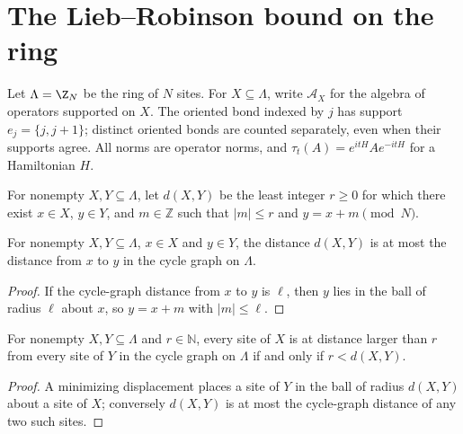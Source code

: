 \section{The Lieb--Robinson bound on the ring}
\label{sec:ring_dynamics_lieb_robinson}

Let $\Lambda=\Z_N$ be the ring of $N$ sites. For $X\subseteq\Lambda$, write
$\mathcal A_X$ for the algebra of operators supported on $X$. The oriented bond
indexed by $j$ has support $e_j=\{j,j+1\}$; distinct oriented bonds are counted
separately, even when their supports agree. All norms are operator norms, and
$\tau_t(A)=e^{itH}Ae^{-itH}$ for a Hamiltonian $H$.

\begin{definition}
    \label{aux:ring-support-distance}
    \leanok
    For nonempty $X,Y\subseteq\Lambda$, let $d(X,Y)$ be the least integer $r\geq0$
    for which there exist $x\in X$, $y\in Y$, and $m\in\mathbb Z$ such that
    $|m|\leq r$ and $y=x+m\pmod N$.
\end{definition}

\begin{lemma}
    \label{aux:ring-support-distance-cycle}
    \leanok
    For nonempty $X,Y\subseteq\Lambda$, $x\in X$ and $y\in Y$, the distance $d(X,Y)$ is at
    most the distance from $x$ to $y$ in the cycle graph on $\Lambda$.
\end{lemma}
\begin{proof}\leanok
    If the cycle-graph distance from $x$ to $y$ is $\ell$, then $y$ lies in the ball of
    radius $\ell$ about $x$, so $y=x+m$ with $|m|\le\ell$.
\end{proof}

\begin{lemma}
    \label{aux:ring-support-distance-separation}
    \leanok
    For nonempty $X,Y\subseteq\Lambda$ and $r\in\mathbb N$, every site of $X$ is at distance
    larger than $r$ from every site of $Y$ in the cycle graph on $\Lambda$ if and only if
    $r<d(X,Y)$.
\end{lemma}
\begin{proof}\leanok
    A minimizing displacement places a site of $Y$ in the ball of radius $d(X,Y)$ about a
    site of $X$; conversely $d(X,Y)$ is at most the cycle-graph distance of any two such
    sites.
\end{proof}


